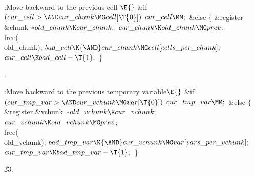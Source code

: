 \B{}:Move  backward to the previous cell%
\X${}\E{}$\6
\&{if} ${}(\\{cur\_cell}>{\AND}\\{cur\_chunk}\MG\\{cell}[\T{0}]){}$\1\5
${}\\{cur\_cell}\MM;{}$\2\6
\&{else}\5
${}\{{}$\1\6
\&{register} \&{chunk} ${}{*}\\{old\_chunk}\K\\{cur\_chunk};{}$\7
${}\\{cur\_chunk}\K\\{old\_chunk}\MG\\{prev}{}$;\5
\\{free}(\\{old\_chunk});\6
${}\\{bad\_cell}\K{\AND}\\{cur\_chunk}\MG\\{cell}[\\{cells\_per\_chunk}];{}$\6
${}\\{cur\_cell}\K\\{bad\_cell}-\T{1};{}$\6
\4${}\}{}$\2\par
{}.\fi

\B{}:Move  backward to the previous
temporary variable\X${}\E{}$\6
\&{if} ${}(\\{cur\_tmp\_var}>{\AND}\\{cur\_vchunk}\MG\\{var}[\T{0}]){}$\1\5
${}\\{cur\_tmp\_var}\MM;{}$\2\6
\&{else}\5
${}\{{}$\1\6
\&{register} \&{vchunk} ${}{*}\\{old\_vchunk}\K\\{cur\_vchunk};{}$\7
${}\\{cur\_vchunk}\K\\{old\_vchunk}\MG\\{prev}{}$;\5
\\{free}(\\{old\_vchunk});\6
${}\\{bad\_tmp\_var}\K{\AND}\\{cur\_vchunk}\MG\\{var}[\\{vars\_per%
\_vchunk}];{}$\6
${}\\{cur\_tmp\_var}\K\\{bad\_tmp\_var}-\T{1};{}$\6
\4${}\}{}$\2\par
\U33.\fi

